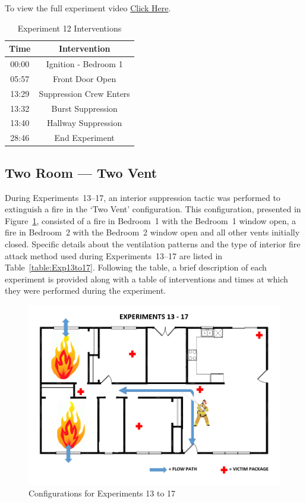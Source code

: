 \documentclass[12pt,oneside]{book}
\begin{document}
To view the full experiment video \href{https://player.vimeo.com/video/170510940?autoplay=1}{Click Here}.

\begin{table}[H]
	\centering
	\caption{Experiment 12 Interventions}
	\begin{tabular}{|c|c|} 
		\hline
		Time & Intervention \\ \hline \hline
		00:00 & Ignition - Bedroom 1 \\ \hline
		05:57 & Front Door Open \\ \hline
		13:29 & Suppression Crew Enters\\ \hline
		13:32 & Burst Suppression \\ \hline 
		13:40 & Hallway Suppression \\ \hline
		28:46 & End Experiment\\ \hline
	\end{tabular}
	\label{Table:Exp12Interventions}
\end{table}

\clearpage

\subsection{Two Room --- Two Vent}

During Experiments~13--17, an interior suppression tactic was performed to extinguish a fire in the `Two Vent' configuration. This configuration, presented in Figure~\ref{fig:Two_Vent_int}, consisted of a fire in Bedroom~1 with the Bedroom~1 window open, a fire in Bedroom~2 with the Bedroom~2 window open and all other vents initially closed. Specific details about the ventilation patterns and the type of interior fire attack method used during Experiments~13--17 are listed in Table~\ref{table:Exp13to17}. Following the table, a brief description of each experiment is provided along with a table of interventions and times at which they were performed during the experiment. 


\begin{figure}[!ht]
	\centering
	\includegraphics[width=5in]{Figures/General/Exps13through17.png}
	\caption{Configurations for Experiments 13 to 17}
	\label{fig:Two_Vent_int}
\end{figure}
\end{document}

